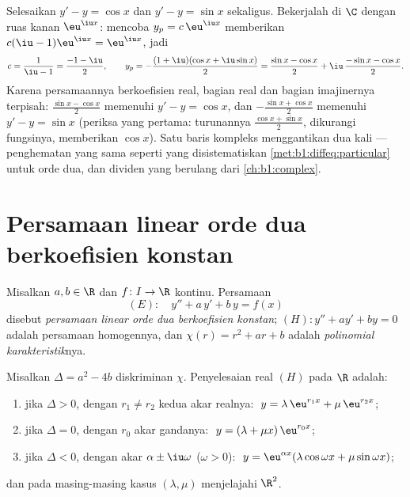 \begin{example}\label{ex:b1:diffeq:complexrhs}
Selesaikan $y' - y = \cos x$ dan $y' - y = \sin x$ sekaligus. Bekerjalah
di $\C$ dengan ruas kanan $\eu^{\iu x}$: mencoba $y_p =
c\,\eu^{\iu x}$ memberikan $c(\iu - 1)\eu^{\iu x} = \eu^{\iu x}$, jadi
\[
c = \frac1{\iu - 1} = \frac{-1 - \iu}2,
\qquad
y_p = -\frac{(1 + \iu)(\cos x + \iu\sin x)}2
= \frac{\sin x - \cos x}2 + \iu\,\frac{-\sin x - \cos x}2 .
\]
Karena persamaannya berkoefisien real, bagian real dan bagian
imajinernya terpisah: $\frac{\sin x - \cos x}2$ memenuhi $y' - y = \cos x$,
dan $-\frac{\sin x + \cos x}2$ memenuhi $y' - y = \sin x$ (periksa
yang pertama: turunannya $\frac{\cos x + \sin x}2$, dikurangi
fungsinya, memberikan $\cos x$). Satu baris kompleks menggantikan dua kali
 --- penghematan yang sama seperti yang disistematiskan
\cref{met:b1:diffeq:particular} untuk orde dua,
dan dividen yang berulang dari \cref{ch:b1:complex}.
\end{example}

\section{Persamaan linear orde dua berkoefisien konstan}

\begin{definition}\label{def:b1:diffeq:linear2}
Misalkan $a, b \in \R$ dan $f \colon I \to \R$ kontinu. Persamaan
\[
(E)\colon\quad y'' + a\,y' + b\,y = f(x)
\]
disebut \emph{persamaan linear orde dua berkoefisien
konstan};
$(H)\colon y'' + ay' + by = 0$ adalah persamaan homogennya, dan
$\chi(r) = r^2 + ar + b$ adalah \emph{polinomial
karakteristik}nya.
\end{definition}

\begin{theorem}\label{thm:b1:diffeq:homogeneous2}
Misalkan $\Delta = a^2 - 4b$ diskriminan $\chi$. Penyelesaian real
$(H)$ pada $\R$ adalah:
\begin{enumerate}
  \item jika $\Delta > 0$, dengan $r_1 \neq r_2$ kedua akar realnya:
        $\;y = \lambda\, \eu^{r_1 x} + \mu\, \eu^{r_2 x}$;
  \item jika $\Delta = 0$, dengan $r_0$ akar gandanya:
        $\;y = (\lambda + \mu x)\, \eu^{r_0 x}$;
  \item jika $\Delta < 0$, dengan akar $\alpha \pm \iu\omega$
        ($\omega > 0$):
        $\;y = \eu^{\alpha x} (\lambda \cos\omega x + \mu
        \sin\omega x)$;
\end{enumerate}
dan pada masing-masing kasus $(\lambda, \mu)$ menjelajahi $\R^2$.
\end{theorem}

